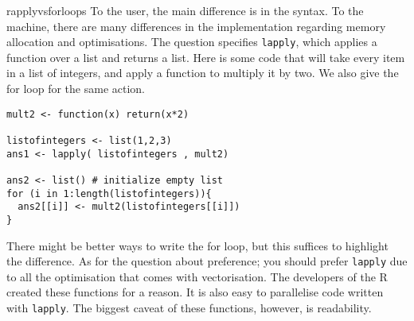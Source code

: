 \begin{answer}{rapplyvsforloops}
 To the user, the main difference is in the syntax.
 To the machine, there are many differences in the implementation regarding memory allocation and optimisations.
 The question specifies \verb+lapply+, which applies a function over a list and returns a list.
 Here is some code that will take every item in a list of integers, and apply a function to multiply it by two.
 We also give the for loop for the same action.

\begin{verbatim}
mult2 <- function(x) return(x*2)

listofintegers <- list(1,2,3)
ans1 <- lapply( listofintegers , mult2)

ans2 <- list() # initialize empty list
for (i in 1:length(listofintegers)){
  ans2[[i]] <- mult2(listofintegers[[i]])
}
\end{verbatim}
There might be better ways to write the for loop, but this suffices to highlight the difference.
As for the question about preference; you should prefer \verb+lapply+ due to all the optimisation that comes with vectorisation.
The developers of the R created these functions for a reason.
It is also easy to parallelise code written with \verb+lapply+.
The biggest caveat of these functions, however, is readability.
\end{answer}
